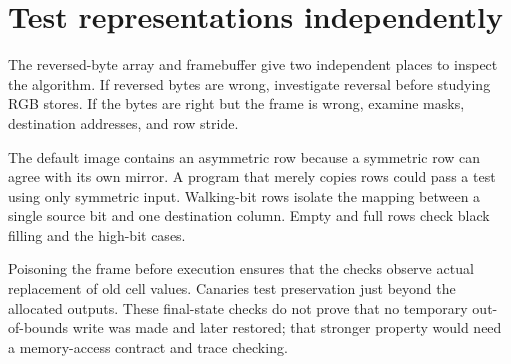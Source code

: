 \section{Test representations
  independently}\label{003-eight-byte-sprite-p09-test-representations-independently}

The reversed-byte array and framebuffer give two independent places to
inspect the algorithm. If reversed bytes are wrong, investigate reversal
before studying RGB stores. If the bytes are right but the frame is
wrong, examine masks, destination addresses, and row stride.

The default image contains an asymmetric row because a symmetric row can
agree with its own mirror. A program that merely copies rows could pass
a test using only symmetric input. Walking-bit rows isolate the mapping
between a single source bit and one destination column. Empty and full
rows check black filling and the high-bit cases.

Poisoning the frame before execution ensures that the checks observe
actual replacement of old cell values. Canaries test preservation just
beyond the allocated outputs. These final-state checks do not prove that
no temporary out-of-bounds write was made and later restored; that
stronger property would need a memory-access contract and trace
checking.
